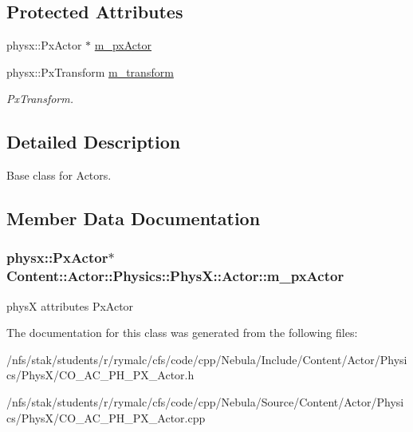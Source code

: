 \subsection*{Protected Attributes}
\begin{Indent}{\bf }\par
{\em \label{_amgrpd41d8cd98f00b204e9800998ecf8427e}
 }\begin{DoxyCompactItemize}
\item 
physx::PxActor $\ast$ \hyperlink{classContent_1_1Actor_1_1Physics_1_1PhysX_1_1Actor_a95d4f68f681a07db21f8b25947e7560a}{m\_\-pxActor}
\item 
\hypertarget{classContent_1_1Actor_1_1Physics_1_1PhysX_1_1Actor_a9e1a6e6d959eb1b9de104dddf4b79ea0}{
physx::PxTransform \hyperlink{classContent_1_1Actor_1_1Physics_1_1PhysX_1_1Actor_a9e1a6e6d959eb1b9de104dddf4b79ea0}{m\_\-transform}}
\label{classContent_1_1Actor_1_1Physics_1_1PhysX_1_1Actor_a9e1a6e6d959eb1b9de104dddf4b79ea0}

\begin{DoxyCompactList}\small\item\em PxTransform. \item\end{DoxyCompactList}\end{DoxyCompactItemize}
\end{Indent}


\subsection{Detailed Description}
Base class for Actors. 

\subsection{Member Data Documentation}
\hypertarget{classContent_1_1Actor_1_1Physics_1_1PhysX_1_1Actor_a95d4f68f681a07db21f8b25947e7560a}{
\subsubsection[{m\_\-pxActor}]{\setlength{\rightskip}{0pt plus 5cm}physx::PxActor$\ast$ {\bf Content::Actor::Physics::PhysX::Actor::m\_\-pxActor}}}
\label{classContent_1_1Actor_1_1Physics_1_1PhysX_1_1Actor_a95d4f68f681a07db21f8b25947e7560a}
physX attributes PxActor 

The documentation for this class was generated from the following files:\begin{DoxyCompactItemize}
\item 
/nfs/stak/students/r/rymalc/cfs/code/cpp/Nebula/Include/Content/Actor/Physics/PhysX/CO\_\-AC\_\-PH\_\-PX\_\-Actor.h\item 
/nfs/stak/students/r/rymalc/cfs/code/cpp/Nebula/Source/Content/Actor/Physics/PhysX/CO\_\-AC\_\-PH\_\-PX\_\-Actor.cpp\end{DoxyCompactItemize}
